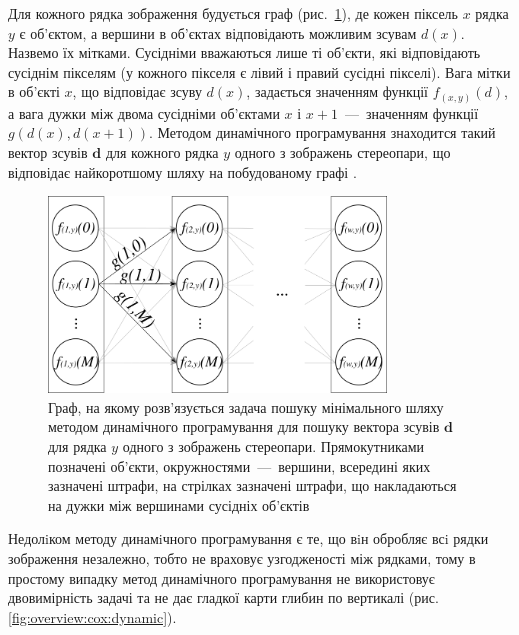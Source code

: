 Для кожного рядка зображення будується граф
(рис.~\ref{fig:dynamic:programming:graph}),
де кожен піксель $x$ рядка $y$ є об'єктом,
а вершини в об'єктах відповідають можливим зсувам $d \left(x \right)$.
Назвемо їх мітками.
Сусідніми вважаються лише ті об'єкти, які відповідають сусіднім пікселям
(у кожного пікселя є лівий і правий сусідні пікселі).
Вага мітки в об'єкті $x$, що відповідає зсуву $d \left(x \right)$,
задається значенням функції $f_{\left( x, y \right)} \left( d \right)$,
а вага дужки між двома сусідніми об'єктами $x$ і $x + 1$~---~значенням функції
$g \left( d \left(x \right), d \left( x + 1 \right) \right)$.
Методом динамічного програмування знаходится
такий вектор зсувів $\pmb{d}$ для кожного рядка $y$
одного з зображень стереопари,
що відповідає найкоротшому шляху на побудованому графі
\cite{overview:cox:dynamic}.

\begin{figure}[h]
  \centering
  \includegraphics[width=0.8\textwidth]{images/dynamic_programming_graph}
  \caption{Граф, на якому розв'язується задача пошуку мінімального
           шляху методом динамічного програмування для пошуку вектора зсувів
           $\pmb{d}$ для рядка $y$ одного з зображень стереопари.
           Прямокутниками позначені об'єкти, окружностями~---~вершини,
           всередині яких зазначені штрафи, на стрілках зазначені штрафи,
           що накладаються на дужки між вершинами сусідніх об'єктів}
  \label{fig:dynamic:programming:graph}
\end{figure}

Недолiком методу динамiчного програмування є те, що вiн обробляє всi
рядки зображення незалежно, тобто не враховує узгодженості між рядками,
тому в простому випадку метод динамічного програмування не використовує
двовимірність задачі та не дає гладкої карти
глибин по вертикалі (рис. \ref{fig:overview:cox:dynamic}).

